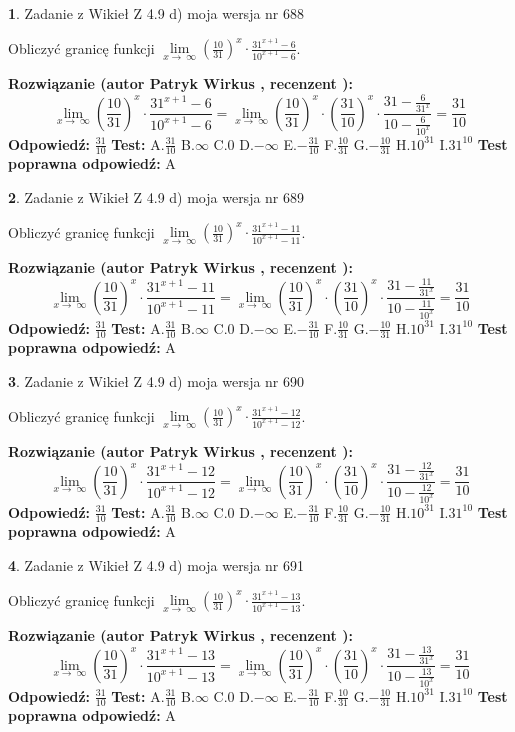 \documentclass[12pt, a4paper]{article}
\theoremstyle{definition} %
\newtheorem{zad}{}
\newcommand{\zadStart}[1]{\begin{zad}#1\newline}
\newcommand{\zadStop}{\end{zad}}
\newcommand{\rozwStart}[2]{\noindent \textbf{Rozwiązanie (autor #1 , recenzent #2): }\newline}
\newcommand{\rozwStop}{\newline}
\newcommand{\odpStart}{\noindent \textbf{Odpowiedź:}\newline}
\newcommand{\odpStop}{\newline}
\newcommand{\testStart}{\noindent \textbf{Test:}\newline}
\newcommand{\testStop}{\newline}
\newcommand{\kluczStart}{\noindent \textbf{Test poprawna odpowiedź:}\newline}
\newcommand{\kluczStop}{\newline}
\begin{document}
\zadStart{Zadanie z Wikieł Z 4.9 d) moja wersja nr 688}


Obliczyć granicę funkcji  $\lim\limits_{x\to\ \infty}(\frac{10}{31})^{x}\cdot\frac{31^{x+1}-6}{10^{x+1}-6}$.
\zadStop
\rozwStart{Patryk Wirkus}{}
$$\lim\limits_{x\to\ \infty}(\frac{10}{31})^{x}\cdot\frac{31^{x+1}-6}{10^{x+1}-6}=\lim\limits_{x\to\ \infty}(\frac{10}{31})^{x}\cdot(\frac{31}{10})^{x} \cdot \frac{31-\frac{6}{31^{x}}}{10-\frac{6}{10^{x}}} = \frac{31}{10}$$
\rozwStop
\odpStart
$\frac{31}{10}$
\odpStop
\testStart
A.$\frac{31}{10}$ B.$\infty$ C.$0$ D.$-\infty$ E.$-\frac{31}{10}$
F.$\frac{10}{31}$ G.$-\frac{10}{31}$
H.$10^{31}$
I.$31^{10}$
\testStop
\kluczStart
A
\kluczStop



\zadStart{Zadanie z Wikieł Z 4.9 d) moja wersja nr 689}


Obliczyć granicę funkcji  $\lim\limits_{x\to\ \infty}(\frac{10}{31})^{x}\cdot\frac{31^{x+1}-11}{10^{x+1}-11}$.
\zadStop
\rozwStart{Patryk Wirkus}{}
$$\lim\limits_{x\to\ \infty}(\frac{10}{31})^{x}\cdot\frac{31^{x+1}-11}{10^{x+1}-11}=\lim\limits_{x\to\ \infty}(\frac{10}{31})^{x}\cdot(\frac{31}{10})^{x} \cdot \frac{31-\frac{11}{31^{x}}}{10-\frac{11}{10^{x}}} = \frac{31}{10}$$
\rozwStop
\odpStart
$\frac{31}{10}$
\odpStop
\testStart
A.$\frac{31}{10}$ B.$\infty$ C.$0$ D.$-\infty$ E.$-\frac{31}{10}$
F.$\frac{10}{31}$ G.$-\frac{10}{31}$
H.$10^{31}$
I.$31^{10}$
\testStop
\kluczStart
A
\kluczStop



\zadStart{Zadanie z Wikieł Z 4.9 d) moja wersja nr 690}


Obliczyć granicę funkcji  $\lim\limits_{x\to\ \infty}(\frac{10}{31})^{x}\cdot\frac{31^{x+1}-12}{10^{x+1}-12}$.
\zadStop
\rozwStart{Patryk Wirkus}{}
$$\lim\limits_{x\to\ \infty}(\frac{10}{31})^{x}\cdot\frac{31^{x+1}-12}{10^{x+1}-12}=\lim\limits_{x\to\ \infty}(\frac{10}{31})^{x}\cdot(\frac{31}{10})^{x} \cdot \frac{31-\frac{12}{31^{x}}}{10-\frac{12}{10^{x}}} = \frac{31}{10}$$
\rozwStop
\odpStart
$\frac{31}{10}$
\odpStop
\testStart
A.$\frac{31}{10}$ B.$\infty$ C.$0$ D.$-\infty$ E.$-\frac{31}{10}$
F.$\frac{10}{31}$ G.$-\frac{10}{31}$
H.$10^{31}$
I.$31^{10}$
\testStop
\kluczStart
A
\kluczStop



\zadStart{Zadanie z Wikieł Z 4.9 d) moja wersja nr 691}


Obliczyć granicę funkcji  $\lim\limits_{x\to\ \infty}(\frac{10}{31})^{x}\cdot\frac{31^{x+1}-13}{10^{x+1}-13}$.
\zadStop
\rozwStart{Patryk Wirkus}{}
$$\lim\limits_{x\to\ \infty}(\frac{10}{31})^{x}\cdot\frac{31^{x+1}-13}{10^{x+1}-13}=\lim\limits_{x\to\ \infty}(\frac{10}{31})^{x}\cdot(\frac{31}{10})^{x} \cdot \frac{31-\frac{13}{31^{x}}}{10-\frac{13}{10^{x}}} = \frac{31}{10}$$
\rozwStop
\odpStart
$\frac{31}{10}$
\odpStop
\testStart
A.$\frac{31}{10}$ B.$\infty$ C.$0$ D.$-\infty$ E.$-\frac{31}{10}$
F.$\frac{10}{31}$ G.$-\frac{10}{31}$
H.$10^{31}$
I.$31^{10}$
\testStop
\kluczStart
A
\kluczStop
\end{document}
